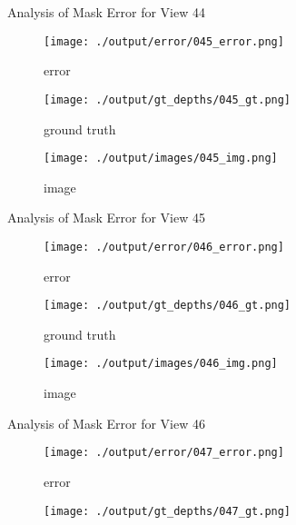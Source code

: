 \documentclass{article}
\begin{document}
\begin{figure}
	\hfill
	\caption{Analysis of Mask Error for View 44}
	\label{fig:error_analys44}
\end{figure}\begin{figure}
	\centering
	\begin{subfigure}{0.3\textwidth}
		\centering
		\texttt{[image: ./output/error/045\_error.png]}
		\caption{error}
		\label{fig:error45}
	\end{subfigure}
	\hfill
	\centering
	\begin{subfigure}{0.3\textwidth}
		\centering
		\texttt{[image: ./output/gt\_depths/045\_gt.png]}
		\caption{ground truth}
		\label{fig:gt45}
	\end{subfigure}
	\hfill
	\centering
	\begin{subfigure}{0.3\textwidth}
		\centering
		\texttt{[image: ./output/images/045\_img.png]}
		\caption{image}
		\label{fig:img45}
	\end{subfigure}
	\hfill
	\caption{Analysis of Mask Error for View 45}
	\label{fig:error_analys45}
\end{figure}\begin{figure}
	\centering
	\begin{subfigure}{0.3\textwidth}
		\centering
		\texttt{[image: ./output/error/046\_error.png]}
		\caption{error}
		\label{fig:error46}
	\end{subfigure}
	\hfill
	\centering
	\begin{subfigure}{0.3\textwidth}
		\centering
		\texttt{[image: ./output/gt\_depths/046\_gt.png]}
		\caption{ground truth}
		\label{fig:gt46}
	\end{subfigure}
	\hfill
	\centering
	\begin{subfigure}{0.3\textwidth}
		\centering
		\texttt{[image: ./output/images/046\_img.png]}
		\caption{image}
		\label{fig:img46}
	\end{subfigure}
	\hfill
	\caption{Analysis of Mask Error for View 46}
	\label{fig:error_analys46}
\end{figure}\begin{figure}
	\centering
	\begin{subfigure}{0.3\textwidth}
		\centering
		\texttt{[image: ./output/error/047\_error.png]}
		\caption{error}
		\label{fig:error47}
	\end{subfigure}
	\hfill
	\centering
	\begin{subfigure}{0.3\textwidth}
		\centering
		\texttt{[image: ./output/gt\_depths/047\_gt.png]}

\end{subfigure}
\end{figure}
\end{document}
